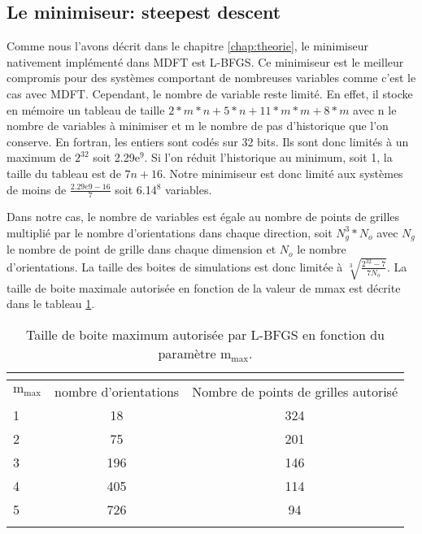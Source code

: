 \subsection{Le minimiseur: steepest descent}
Comme nous l'avons décrit dans le chapitre \ref{chap:theorie}, le minimiseur nativement implémenté dans MDFT est L-BFGS. Ce minimiseur est le meilleur compromis pour des systèmes comportant de nombreuses variables comme c'est le cas avec MDFT. Cependant, le nombre de variable reste limité. En effet, il stocke en mémoire un tableau de taille $2*m*n + 5*n + 11*m*m + 8*m$ avec n le nombre de variables à minimiser et m le nombre de pas d'historique que l'on conserve. En fortran, les entiers sont codés sur 32 bits. Ils sont donc limités à un maximum de $2^{32}$ soit 2.29e$^9$. Si l'on réduit l'historique au minimum, soit 1, la taille du tableau est de $7n+16$. Notre minimiseur est donc limité aux systèmes de moins de $\frac{2.29e9-16}{7}$ soit 6.14$^{8}$ variables. 

Dans notre cas, le nombre de variables est égale au nombre de points de grilles multiplié par le nombre d'orientations dans chaque direction, soit $N_g^3 * N_o$ avec $N_g$ le nombre de point de grille dans chaque dimension et $N_o$ le nombre d'orientations. La taille des boites de simulations est donc limitée à $\sqrt[3]{\frac{2^{32}-7}{7N_o}}$. La taille de boite maximale autorisée en fonction de la valeur de mmax est décrite dans le tableau \ref{tab:taille_boite_max}.



\begin{table}[H]
 \centering
  \begin{tabular}{l | c | c }
    \hline \multicolumn{3}{c}{} \\[-1em]\hline
    $\mathrm{m}_\mathrm{max}$ & nombre d'orientations & Nombre de points de grilles autorisé \\
    \hline
    1  & 18 & 324 \\
    2  & 75 & 201 \\
    3  & 196 & 146 \\
    4  & 405 & 114 \\
    5  & 726 & 94 \\
    \hline \multicolumn{3}{c}{} \\[-1em]\hline
  \end{tabular}
  \caption{Taille de boite maximum autorisée par L-BFGS en fonction du paramètre $\mathrm{m}_\mathrm{max}$.}
  \label{tab:taille_boite_max}  
\end{table}


